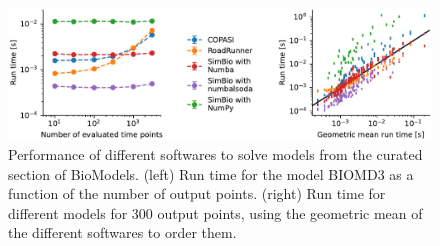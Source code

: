 \begin{figure}[t]

{\centering \includegraphics{src/performance/figures/performance}

}

\caption{\label{fig-runtime}Performance of different softwares to solve
models from the curated section of BioModels. (left) Run time for the
model BIOMD3 as a function of the number of output points. (right) Run
time for different models for 300 output points, using the geometric
mean of the different softwares to order them.}

\end{figure}
